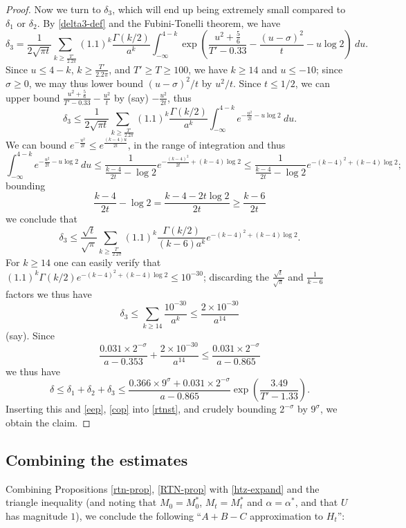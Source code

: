 \begin{proof}
Now we turn to $\delta_3$, which will end up being extremely small compared to $\delta_1$ or $\delta_2$. By \eqref{delta3-def} and the Fubini-Tonelli theorem, we have
$$ \delta_3 = \frac{1}{2 \sqrt{\pi t}} \sum_{k \geq \frac{T'}{2.2 \pi}} (1.1)^{k} \frac{\Gamma(k/2)}{a^k} \int_{-\infty}^{4-k} \exp\left( \frac{u^2 + \frac{5}{6}}{T'-0.33}  - \frac{(u-\sigma)^2}{t} - u \log 2\right)\ du.$$
Since $u \leq 4-k$, $k \geq \frac{T'}{2.2\pi}$, and $T' \geq T \geq 100$, we have $k \geq 14$ and $u \leq -10$; since $\sigma \geq 0$, we may thus lower bound $(u-\sigma)^2/t$ by $u^2/t$.  Since $t \leq 1/2$, we can upper bound $\frac{u^2 + \frac{5}{6}}{T'-0.33} - \frac{u^2}{t}$ by (say) $-\frac{u^2}{2t}$, thus
$$ \delta_3 \leq \frac{1}{2 \sqrt{\pi t}} \sum_{k \geq \frac{T'}{2.2 \pi}} (1.1)^{k} \frac{\Gamma(k/2)}{a^k} \int_{-\infty}^{4-k} e^{-\frac{u^2}{2t} - u \log 2}\ du.$$
We can bound $e^{-\frac{u^2}{2t}} \leq e^{\frac{(k-4)u}{2t}}$, in the range of integration and thus
$$ \int_{-\infty}^{4-k} e^{-\frac{u^2}{2t} - u \log 2}\ du \leq \frac{1}{\frac{k-4}{2t} - \log 2} e^{-\frac{(k-4)^2}{2t} + (k-4) \log 2} \leq \frac{1}{\frac{k-4}{2t} - \log 2} e^{-(k-4)^2 + (k-4) \log 2};$$
bounding
$$ \frac{k-4}{2t} - \log 2 = \frac{k-4-2t \log 2}{2t} \geq \frac{k-6}{2t}$$
we conclude that
$$ \delta_3 \leq \frac{\sqrt{t}}{\sqrt{\pi}} \sum_{k \geq \frac{T'}{2.2 \pi}} (1.1)^{k} \frac{\Gamma(k/2)}{(k-6) a^k} e^{-(k-4)^2 + (k-4) \log 2}.$$
For $k \geq 14$ one can easily verify that $(1.1)^{k} \Gamma(k/2) e^{-(k-4)^2 + (k-4) \log 2} \leq 10^{-30}$; discarding the $\frac{\sqrt{t}}{\sqrt{\pi}}$ and $\frac{1}{k-6}$ factors we thus have
$$ \delta_3 \leq \sum_{k \geq 14} \frac{10^{-30}}{a^k} \leq \frac{2 \times 10^{-30}}{a^{14}}$$
(say).   Since
$$ \frac{0.031 \times 2^{-\sigma}}{a-0.353} + \frac{2 \times 10^{-30}}{a^{14}} \leq \frac{0.031 \times 2^{-\sigma}}{a-0.865}$$
we thus have
$$ \delta \leq \delta_1+\delta_2+\delta_3 \leq \frac{0.366 \times 9^\sigma + 0.031 \times 2^{-\sigma}}{a-0.865} \exp\left( \frac{3.49}{T'-1.33} \right).$$
Inserting this and \eqref{eep}, \eqref{cop} into \eqref{rtnst}, and crudely bounding $2^{-\sigma}$ by $9^\sigma$, we obtain the claim.
\end{proof}

\subsection{Combining the estimates}


Combining Propositions \ref{rtn-prop}, \ref{RTN-prop} with \eqref{htz-expand} and the triangle inequality (and noting that $M_0 = M_0^*$, $M_t = M_t^*$ and $\alpha = \alpha^*$, and that $U$ has magnitude $1$), we conclude the following ``$A+B-C$ approximation to $H_t$'':

